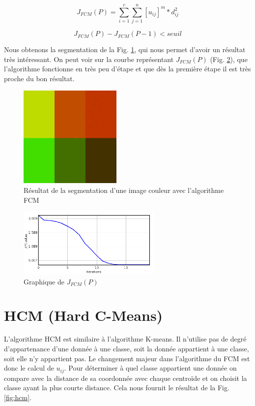 \documentclass[a4paper,11pt]{article}
\begin{document}
\begin{equation}
  \label{jp}
  J_{FCM}(P)=\sum_{i=1}^{c}\sum_{j=1}^{n}[u_{ij}]^m * d_{ij}^2
\end{equation}

\begin{equation}
  \label{jpMin} 
  J_{FCM}(P) - J_{FCM}(P-1) < seuil
\end{equation}

Nous obtenons la segmentation de la Fig. \ref{fig:segmentationFCM}, qui nous permet d'avoir
un résultat très intéressant. On peut voir sur la courbe représentant $J_{FCM}(P)$ (Fig. \ref{fig:graphFCM}), que l'algorithme
fonctionne en très peu d'étape et que dès la première étape il est très proche du bon résultat.

\begin{figure}[!h]
  \begin{center}
    \includegraphics[width=5cm]{resultat/FCM.png}
    \caption{Résultat de la segmentation d'une image couleur avec l'algorithme FCM}
    \label{fig:segmentationFCM}
  \end{center}
\end{figure}

\begin{figure}[!h]
  \begin{center}
    \includegraphics[width=7cm]{resultat/FCM_graph.png}
    \caption{Graphique de $J_{FCM}(P)$}
    \label{fig:graphFCM}
  \end{center}
\end{figure}

\section{HCM (Hard C-Means)}
L'algorithme HCM est similaire à l'algorithme K-means. Il n'utilise pas de degré d'appartenance
d'une donnée à une classe, soit la donnée appartient à une classe, soit elle n'y appartient pas.
Le changement majeur dans l'algorithme du FCM est donc le calcul de $u_{ij}$. Pour déterminer à quel
classe appartient une donnée on compare avec la distance de sa coordonnée avec chaque centroïde et
on choisit la classe ayant la plus courte distance. Cela nous fournit le résultat de la Fig. \ref{fig:hcm}.\\
\end{document}
